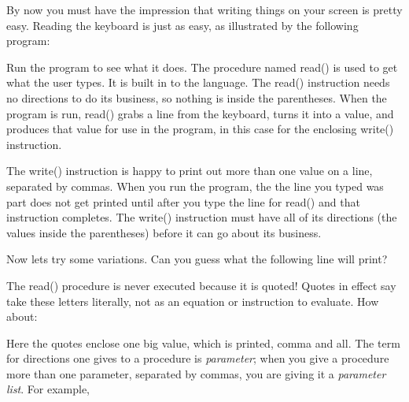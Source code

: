 By now you must have the impression that writing things on your screen
is pretty easy. Reading the keyboard is just as easy,
as illustrated by the following program:


Run the program to see what it does. The procedure named
\textsf{read()} is used to get what the user types. It is
built in to the language. The \textsf{read()} instruction needs no
directions to do its business, so nothing is inside the parentheses.
When the program is run, \textsf{read()} grabs a line from the
keyboard, turns it into a value, and produces that value for use in the
program, in this case for the enclosing \textsf{write()} instruction.

\textsf{The }\textsf{write()} instruction is happy to print out more
than one value on a line, separated by commas. When you run the
program, the \textsf{{\textquotedbl}the line you typed
was{\textquotedbl}} part does not get printed until after you type the
line for \textsf{read()} and that instruction completes. The
\textsf{write()} instruction must have all of its directions (the
values inside the parentheses) before it can go about its business.

Now let{\textquotesingle}s try some variations. Can you guess what the
following line will print?


The \textsf{read()} procedure is never executed because it is quoted!
Quotes in effect say {\textquotedbl}take these letters literally, not
as an equation or instruction to evaluate.{\textquotedbl} How about:


\noindent Here the quotes enclose one big value, which is printed, comma
and all. The term for directions one gives to a procedure is
\textit{parameter}; when you give a procedure more than one parameter,
separated by commas, you are giving it a
\textit{parameter list}. For example,

